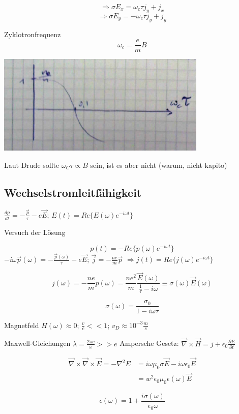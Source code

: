 \[ \Rightarrow \sigma E_x = \omega_c \tau j_y + j_x\]
\[ \Rightarrow \sigma E_y = -\omega_c \tau j_y + j_y\]

Zyklotronfrequenz
\[ \omega_c = \frac{e}{m}B \]

\includegraphics[width=0.75\textwidth]{kap06_20.png}

Laut Drude sollte \(\omega_C\tau \propto B\) sein, ist es aber nicht (warum, nicht kapito)

\subsection{Wechselstromleitfähigkeit}

\(\frac{dp}{dt} = -\frac{\vec p}{\tau} - e\vec E\); \(E(t) = Re\{E(\omega)e^{-i\omega t}\}\)

Versuch der Lösung

\[ p(t) = - Re\{p(\omega)e^{-i\omega t}\} \]
\( -i\omega \vec p(\omega) = -\frac{\vec p(\omega)}{\tau}-e\vec E\); \(\vec j = -\frac{ne}{m}\vec p\)
\(\Rightarrow j(t) =  Re\{j(\omega)e^{-i\omega t}\}\)

\[ j(\omega) = -\frac{ne}{m} p(\omega) = \frac{ne^2}{m}\frac{\vec E(\omega)}{\frac{1}{\tau}-i\omega}\equiv\sigma(\omega)\vec E(\omega) \]

\[\boxed{\sigma(\omega) = \frac{\sigma_0}{1-i\omega\tau}}\]

Magnetfeld \(H(\omega) \approx 0\); \(\frac{v}{c}<< 1\); \(v_D\approx 10^{-3}\frac{m}{s}\)

Maxwell-Gleichungen \(\lambda = \frac{2\pi c}{\omega}>> e \)
Ampersche Gesetz: \(\vec \nabla \times \vec H = j + \epsilon_0\frac{\partial E}{\partial t}\)

\begin{align}
\vec \nabla \times \vec \nabla \times \vec E = -\nabla^2 E &= i\omega \mu_0\sigma \vec E - i\omega \epsilon_0\vec E\\
&=w^2 \epsilon_0\mu_0\epsilon(\omega) \vec E
\end{align}

\[\epsilon (\omega) = 1+ \frac{i\sigma(\omega)}{\epsilon_0 \omega}\]



